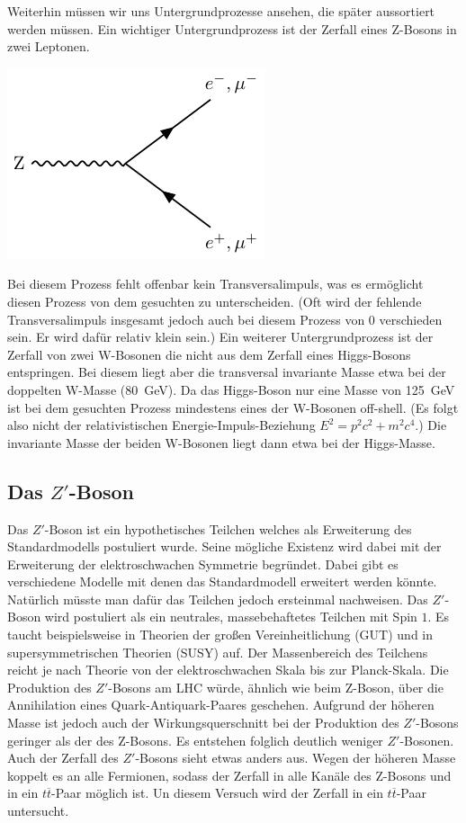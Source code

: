Weiterhin müssen wir uns Untergrundprozesse ansehen, die später aussortiert werden müssen.
Ein wichtiger Untergrundprozess ist der Zerfall eines Z-Bosons in zwei Leptonen.
\begin{center}
  \includegraphics{../Pictures/generate_feynman_Zll/Zll-feynman.pdf}
  \label{Zll}
\end{center}
Bei diesem Prozess fehlt offenbar kein Transversalimpuls, was es ermöglicht diesen Prozess von dem gesuchten zu unterscheiden.
(Oft wird der fehlende Transversalimpuls insgesamt jedoch auch bei diesem Prozess von $0$ verschieden sein. Er wird dafür relativ klein sein.)
Ein weiterer Untergrundprozess ist der Zerfall von zwei W-Bosonen die nicht aus dem Zerfall eines Higgs-Bosons entspringen.
Bei diesem liegt aber die transversal invariante Masse etwa bei der doppelten W-Masse (\SI{80}{\giga\electronvolt}).
Da das Higgs-Boson nur eine Masse von \SI{125}{\giga\electronvolt} ist bei dem gesuchten Prozess mindestens eines der W-Bosonen off-shell. (Es folgt also nicht der relativistischen Energie-Impuls-Beziehung $E^{2} = p^{2}c^{2} + m^{2}c^{4}$.)
Die invariante Masse der beiden W-Bosonen liegt dann etwa bei der Higgs-Masse.

\subsection{Das $Z'$-Boson}
Das $Z'$-Boson ist ein hypothetisches Teilchen welches als Erweiterung des Standardmodells postuliert wurde.
Seine mögliche Existenz wird dabei mit der Erweiterung der elektroschwachen Symmetrie begründet.
Dabei gibt es verschiedene Modelle mit denen das Standardmodell erweitert werden könnte.
Natürlich müsste man dafür das Teilchen jedoch ersteinmal nachweisen.
Das $Z'$-Boson wird postuliert als ein neutrales, massebehaftetes Teilchen mit Spin $1$.
Es taucht beispielsweise in Theorien der großen Vereinheitlichung (GUT) und in supersymmetrischen Theorien (SUSY) auf.
Der Massenbereich des Teilchens reicht je nach Theorie von der elektroschwachen Skala bis zur Planck-Skala.
Die Produktion des $Z'$-Bosons am LHC würde, ähnlich wie beim Z-Boson, über die Annihilation eines Quark-Antiquark-Paares geschehen.
Aufgrund der höheren Masse ist jedoch auch der Wirkungsquerschnitt bei der Produktion des $Z'$-Bosons geringer als der des Z-Bosons.
Es entstehen folglich deutlich weniger $Z'$-Bosonen.
Auch der Zerfall des $Z'$-Bosons sieht etwas anders aus.
Wegen der höheren Masse koppelt es an alle Fermionen, sodass der Zerfall in alle Kanäle des Z-Bosons und in ein $t\overline{t}$-Paar möglich ist.
Un diesem Versuch wird der Zerfall in ein $t\overline{t}$-Paar untersucht.

